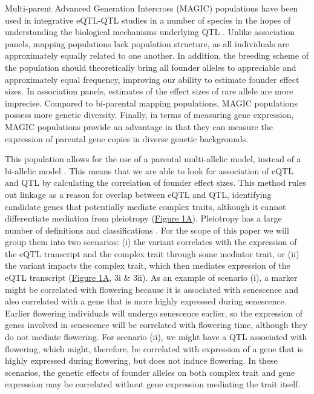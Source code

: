 \documentclass[article,9pt,twocolumn,twoside]{rilabRxiv}
\begin{document}
\par
Multi-parent Advanced Generation Intercross (MAGIC) populations have been used in integrative eQTL-QTL studies in a number of species in the hopes of understanding the biological mechanisms underlying QTL \citep{DellAcqua,Miculan,Snoek}.
Unlike association panels, mapping populations lack population structure, as all individuals are approximately equally related to one another.
In addition, the breeding scheme of the population should theoretically bring all founder alleles to appreciable and approximately equal frequency, improving our ability to estimate founder effect sizes.
In association panels, estimates of the effect sizes of rare allele are more imprecise.
Compared to bi-parental mapping populations, MAGIC populations possess more genetic diversity.
Finally, in terms of measuring gene expression, MAGIC populations provide an advantage in that they can measure the expression of parental gene copies in diverse genetic backgrounds.
\par
This population allows for the use of a parental multi-allelic model, instead of a bi-allelic model \citep{Odell}.
This means that we are able to look for association of eQTL and QTL by calculating the correlation of founder effect sizes.
This method rules out linkage as a reason for overlap between eQTL and QTL, identifying candidate genes that potentially mediate complex traits, although it cannot differentiate mediation from pleiotropy (\hyperref[fig:scenarios]{Figure 1A}).
Pleiotropy has a large number of definitions and classifications \citep{Paaby,Solovieff,Hu2}.
For the scope of this paper we will group them into two scenarios: (i) the variant correlates with the expression of the eQTL transcript and the complex trait through some mediator trait, or (ii) the variant impacts the complex trait, which then mediates expression of the eQTL transcript (\hyperref[fig:scenarios]{Figure 1A}, 3i \& 3ii).
As an example of scenario (i), a marker might be correlated with flowering because it is associated with senescence and also correlated with a gene that is more highly expressed during senescence.
Earlier flowering individuals will undergo senescence earlier, so the expression of genes involved in senescence will be correlated with flowering time, although they do not mediate flowering.
For scenario (ii), we might have a QTL associated with flowering, which might, therefore, be correlated with expression of a gene that is highly expressed during flowering, but does not induce flowering. 
In these scenarios, the genetic effects of founder alleles on both complex trait and gene expression may be correlated without gene expression mediating the trait itself.
\end{document}
